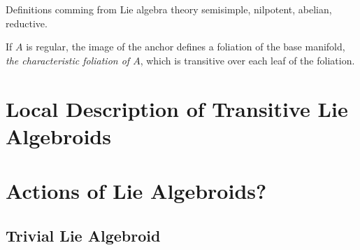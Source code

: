 Definitions comming from Lie algebra theory semisimple, nilpotent, abelian, reductive.

If $A$ is regular, the image of the anchor defines a foliation of the base manifold, \emph{the characteristic foliation of $A$}, which is transitive over each leaf of the foliation.

\section{Local Description of Transitive Lie Algebroids}

\section{Actions of Lie Algebroids?}\subsection{Trivial Lie Algebroid}
